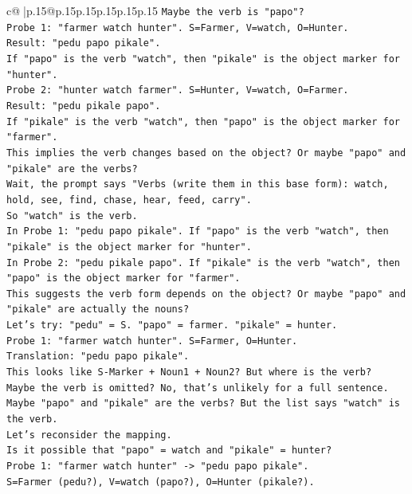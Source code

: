 \documentclass{article}
\begin{document}
{\begin{supertabular}{c@{$\;$}|p{.15\linewidth}@{}p{.15\linewidth}p{.15\linewidth}p{.15\linewidth}p{.15\linewidth}p{.15\linewidth}}
{{{\texttt{Maybe the verb is "papo"?} \\
\texttt{Probe 1: "farmer watch hunter". S=Farmer, V=watch, O=Hunter.} \\
\texttt{Result: "pedu papo pikale".} \\
\texttt{If "papo" is the verb "watch", then "pikale" is the object marker for "hunter".} \\
\texttt{Probe 2: "hunter watch farmer". S=Hunter, V=watch, O=Farmer.} \\
\texttt{Result: "pedu pikale papo".} \\
\texttt{If "pikale" is the verb "watch", then "papo" is the object marker for "farmer".} \\
\texttt{This implies the verb changes based on the object? Or maybe "papo" and "pikale" are the verbs?} \\
\texttt{Wait, the prompt says "Verbs (write them in this base form): watch, hold, see, find, chase, hear, feed, carry".} \\
\texttt{So "watch" is the verb.} \\
\texttt{In Probe 1: "pedu papo pikale". If "papo" is the verb "watch", then "pikale" is the object marker for "hunter".} \\
\texttt{In Probe 2: "pedu pikale papo". If "pikale" is the verb "watch", then "papo" is the object marker for "farmer".} \\
\texttt{This suggests the verb form depends on the object? Or maybe "papo" and "pikale" are actually the nouns?} \\
\texttt{Let's try: "pedu" = S. "papo" = farmer. "pikale" = hunter.} \\
\texttt{Probe 1: "farmer watch hunter". S=Farmer, O=Hunter.} \\
\texttt{Translation: "pedu papo pikale".} \\
\texttt{This looks like S{-}Marker + Noun1 + Noun2? But where is the verb?} \\
\texttt{Maybe the verb is omitted? No, that's unlikely for a full sentence.} \\
\texttt{Maybe "papo" and "pikale" are the verbs? But the list says "watch" is the verb.} \\
\texttt{Let's reconsider the mapping.} \\
\texttt{Is it possible that "papo" = watch and "pikale" = hunter?} \\
\texttt{Probe 1: "farmer watch hunter" {-}> "pedu papo pikale".} \\
\texttt{S=Farmer (pedu?), V=watch (papo?), O=Hunter (pikale?).} \\
}}}
\end{supertabular}}
\end{document}
